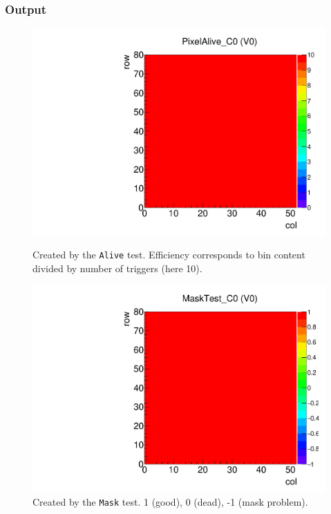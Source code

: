 \subsubsection{Output}

\begin{figure}[!Hp]
\centering
\begin{minipage}{0.45\textwidth}
  \includegraphics[width=1.0\textwidth]{figures/alive_PixelAlive.pdf}
  \caption{Created by the {\tt Alive} test. 
  Efficiency corresponds to bin content divided by number of triggers (here 10).}
  \label{fig:alive_PixelAlive}
\end{minipage}
\hspace{0.3cm}
\begin{minipage}{0.45\textwidth}
  \includegraphics[width=1.0\textwidth]{figures/alive_MaskTest.pdf}
  \caption{Created by the {\tt Mask} test.
  1 (good), 0 (dead), -1 (mask problem).}
  \label{fig:alive_MaskTest}
\end{minipage}
\end{figure}

